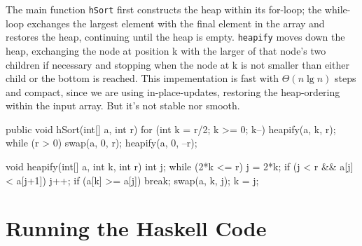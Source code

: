 \begin{impl}
The main function \texttt{hSort} first constructs the heap within its for-loop; the while-loop exchanges the largest element with the final element in the array and restores the heap, continuing until the heap is empty.
\texttt{heapify} moves down the heap, exchanging the node at position k with the larger of that node's two children if necessary and stopping when the node at k is not smaller than either child or the bottom is reached.
This impementation is fast with $\Theta(n \lg n)$ steps and compact, since we are using in-place-updates, restoring the heap-ordering within the input array. But it's not stable nor smooth.
\end{impl}

\begin{javacode}
public void hSort(int[] a, int r) {
    for (int k = r/2; k >= 0; k--)
        heapify(a, k, r);
    while (r > 0) {
        swap(a, 0, r);
        heapify(a, 0, --r);
    }
}

void heapify(int[] a, int k, int r) {
    int j;
    while (2*k <= r) {
        j = 2*k;
        if (j < r && a[j] < a[j+1]) j++;
        if (a[k] >= a[j]) break;
        swap(a, k, j);
        k = j;
    }
}
\end{javacode}

\section{Running the Haskell Code}

